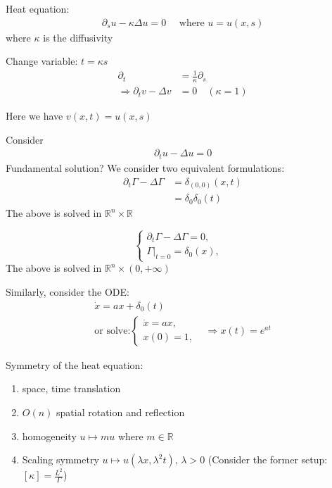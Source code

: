 \documentclass[11pt]{article}
\begin{document}

Heat equation:
\begin{align*}
    \partial_{s}u - \kappa \Delta u = 0 \quad \text{ where }u  = u(x,s)
\end{align*}
where $\kappa $ is the diffusivity

Change variable: $t = \kappa s$
\begin{align*}
    \partial_{t} &= \frac{1}{\kappa}\partial_{s} \\
    \Longrightarrow \partial_{t} v - \Delta v &= 0 \quad (\kappa = 1)
\end{align*}

Here we have $v(x,t) = u(x,s)$

Consider 
\begin{align*}
    \partial_{t}u - \Delta u = 0
\end{align*}
Fundamental solution? We consider two equivalent formulations:
\begin{align*}
    \partial_{t}\Gamma - \Delta \Gamma &= \delta_{(0,0)}(x,t) \\
    &= \delta_{0} \delta_0(t)
\end{align*}
The above is solved in $\mathbb{R}^{n} \times \mathbb{R}$


\begin{equation}
    \begin{cases} 
    \partial_{t}\Gamma - \Delta \Gamma = 0, &  \\ 
    \Gamma|_{t=0} = \delta_{0}(x), &   
    \end{cases}
\end{equation}
The above is solved in $\mathbb{R}^{n} \times (0,+\infty)$

Similarly, consider the ODE:
\begin{equation}
    \begin{aligned}
        \dot{x} = ax + \delta_0(t)& \\
        \text{or solve:}
    \begin{cases} 
    \dot{x} = ax,   \\ 
    x(0) = 1,    
    \end{cases}
    &\Longrightarrow x(t) = e^{at}
    \end{aligned}
\end{equation}

Symmetry of the heat equation:
\begin{enumerate}
    \item space, time translation 
    \item $O(n)$ spatial rotation and reflection 
    \item homogeneity $u \mapsto mu$ where $m \in \mathbb{R}$
    \item Scaling symmetry $u \mapsto u(\lambda x, \lambda^{2}t),\, \lambda > 0$ (Consider the former 
    setup: $[\kappa] = \frac{L^{2}}{\Gamma}$)
\end{enumerate}
\end{document}
